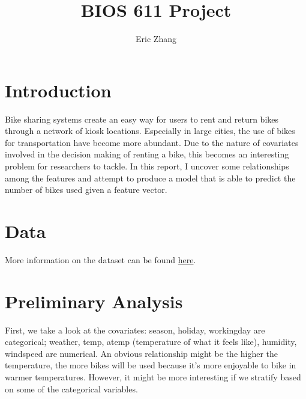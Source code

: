 \documentclass{article}
\title{BIOS 611 Project}
\author{Eric Zhang }
\date{}
\begin{document}
\maketitle
\tableofcontents

\newpage
\section{Introduction}
Bike sharing systems create an easy way for users to rent and return bikes through a network of kiosk locations. Especially in large cities, the use of bikes for transportation have become more abundant. Due to the nature of covariates involved in the decision making of renting a bike, this becomes an interesting problem for researchers to tackle. In this report, I uncover some relationships among the features and attempt to produce a model that is able to predict the number of bikes used given a feature vector.

\section{Data}
More information on the dataset can be found \href{https://www.kaggle.com/c/bike-sharing-demand/data}{here}.

\section{Preliminary Analysis}
First, we take a look at the covariates: season, holiday, workingday are categorical; weather, temp, atemp (temperature of what it feels like), humidity, windspeed are numerical. An obvious relationship might be the higher the temperature, the more bikes will be used because it's more enjoyable to bike in warmer temperatures. However, it might be more interesting if we stratify based on some of the categorical variables.
\end{document}
